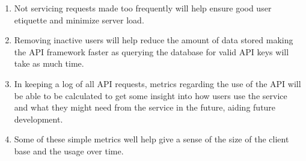 \begin{enumerate}
\begin{enumerate}
                \item Not servicing requests made too frequently will help ensure good user etiquette and minimize server load.
                
                \item Removing inactive users will help reduce the amount of data stored making the API framework faster as querying the database for valid API keys will take as much time.
                
                \item In keeping a log of all API requests, metrics regarding the use of the API will be able to be calculated to get some insight into how users use the service and what they might need from the service in the future, aiding future development.
                
                \item Some of these simple metrics well help give a sense of the size of the client base and the usage over time.
            
            \end{enumerate}
        
        \end{enumerate}
